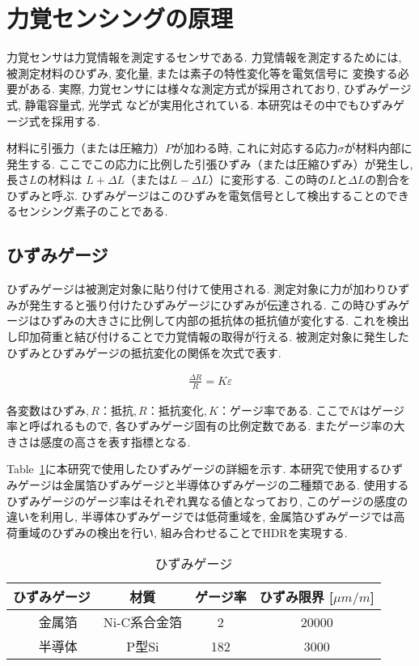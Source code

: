 \section{力覚センシングの原理}
力覚センサは力覚情報を測定するセンサである. 
力覚情報を測定するためには, 被測定材料のひずみ, 変化量, または素子の特性変化等を電気信号に
変換する必要がある. 
実際, 力覚センサには様々な測定方式が採用されており, 
ひずみゲージ式\cite{nishiwaki2002six}\cite{Liang2010}, 
静電容量式\cite{Beyeler2009}, 
光学式\cite{Kim2013a}\cite{su20093}\cite{polygerinos2010novel}
などが実用化されている.
本研究はその中でもひずみゲージ式を採用する. 

材料に引張力（または圧縮力）$P$が加わる時, これに対応する応力$σ$が材料内部に発生する.
ここでこの応力に比例した引張ひずみ（または圧縮ひずみ）が発生し, 長さ$L$の材料は
$L + \Delta L$（または$L - \Delta L$）に変形する. 
この時の$L$と$\Delta L$の割合をひずみと呼ぶ. 
ひずみゲージはこのひずみを電気信号として検出することのできるセンシング素子のことである. 

\subsection*{ひずみゲージ}
ひずみゲージは被測定対象に貼り付けて使用される. 
測定対象に力が加わりひずみが発生すると張り付けたひずみゲージにひずみが伝達される. 
この時ひずみゲージはひずみの大きさに比例して内部の抵抗体の抵抗値が変化する. 
これを検出し印加荷重と結び付けることで力覚情報の取得が行える. 
被測定対象に発生したひずみとひずみゲージの抵抗変化の関係を次式で表す. 

\begin{eqnarray}
    \frac{\Delta R}{R} = K \varepsilon 
\end{eqnarray}

各変数は$ひずみ, R：抵抗, R：抵抗変化, K：ゲージ率$である. 
ここで$K$はゲージ率と呼ばれるもので, 各ひずみゲージ固有の比例定数である. 
またゲージ率の大きさは感度の高さを表す指標となる. 

Table~\ref{tb:gage}に本研究で使用したひずみゲージの詳細を示す. 
本研究で使用するひずみゲージは金属箔ひずみゲージと半導体ひずみゲージの二種類である. 
使用するひずみゲージのゲージ率はそれぞれ異なる値となっており,  
このゲージの感度の違いを利用し, 半導体ひずみゲージでは低荷重域を, 
金属箔ひずみゲージでは高荷重域のひずみの検出を行い, 
組み合わせることでHDRを実現する. 

\begin{table}[h]
    \caption{ひずみゲージ}\label{tb:gage}
    \begin{center}
     \begin{tabular}{ c c c c }
      \hline
      ひずみゲージ & 材質 & ゲージ率 & ひずみ限界 [$\mu m/m$] \\
      \hline
    　金属箔 & Ni-C系合金箔 & 2 & 20000\\
      \hline
    　半導体 & P型Si & 182 & 3000 \\
      \hline   
     \end{tabular}
    \end{center}
   \end{table}



